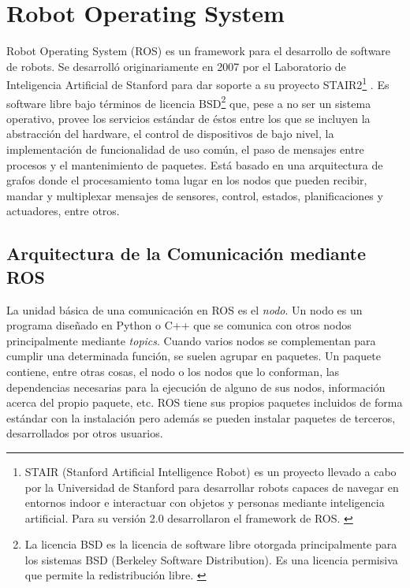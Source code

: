 \section{Robot Operating System}

Robot Operating System (ROS) es un framework para el desarrollo de software de robots. Se desarrolló originariamente en 2007 por el Laboratorio de Inteligencia Artificial de Stanford para dar soporte a su proyecto STAIR2\footnote{STAIR (Stanford Artificial Intelligence Robot) es un proyecto llevado a cabo por la Universidad de Stanford para desarrollar robots capaces de navegar en entornos indoor e interactuar con objetos y personas mediante inteligencia artificial. Para su versión 2.0 desarrollaron el framework de ROS. \cite{stair}} \cite{stair_paper}. Es software libre bajo términos de licencia BSD\footnote{La licencia BSD es la licencia de software libre otorgada principalmente para los sistemas BSD (Berkeley Software Distribution). Es una licencia permisiva que permite la redistribución libre. \cite{licencia}} que, pese a no ser un sistema operativo, provee los servicios estándar de éstos entre los que se incluyen la abstracción del hardware, el control de dispositivos de bajo nivel, la implementación de funcionalidad de uso común, el paso de mensajes entre procesos y el mantenimiento de paquetes. Está basado en una arquitectura de grafos donde el procesamiento toma lugar en los nodos que pueden recibir, mandar y multiplexar mensajes de sensores, control, estados, planificaciones y actuadores, entre otros.\\


\subsection{Arquitectura de la Comunicación mediante ROS}

La unidad básica de una comunicación en ROS es el \textit{nodo}. Un nodo es un programa diseñado en Python o C++ que se comunica con otros nodos principalmente mediante \textit{topics}. Cuando varios nodos se complementan para cumplir una determinada función, se suelen agrupar en paquetes. Un paquete contiene, entre otras cosas, el nodo o los nodos que lo conforman, las dependencias necesarias para la ejecución de alguno de sus nodos, información acerca del propio paquete, etc. ROS tiene sus propios paquetes incluidos de forma estándar con la instalación pero además se pueden instalar paquetes de terceros, desarrollados por otros usuarios.\\

